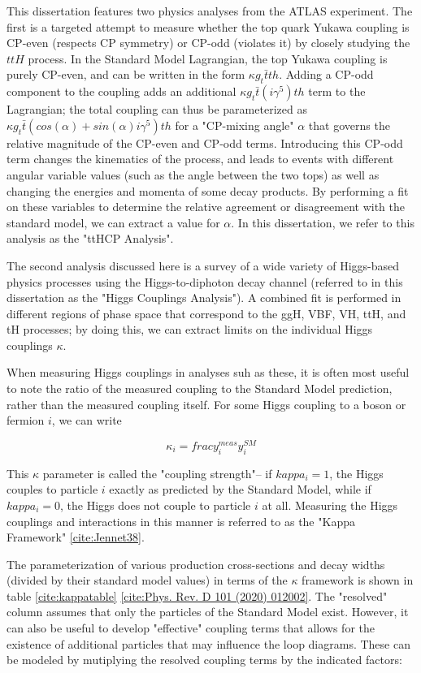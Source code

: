 This dissertation features two physics analyses from the ATLAS experiment. The first is a targeted attempt to measure whether the top quark Yukawa coupling is CP-even (respects CP symmetry) or CP-odd (violates it) by closely studying the $ttH$ process. In the Standard Model Lagrangian, the top Yukawa coupling is purely CP-even, and can be written in the form $\kappa g_{t} \bar{t}th$. Adding a CP-odd component to the coupling adds an additional $\kappa g_{t} \bar{t} (i \gamma^{5})th$ term to the Lagrangian; the total coupling can thus be parameterized as $\kappa g_{t} \bar{t} (cos(\alpha)+ sin(\alpha) i \gamma^{5} )th$ for a "CP-mixing angle" $\alpha$ that governs the relative magnitude of the CP-even and CP-odd terms. Introducing this CP-odd term changes the kinematics of the process, and leads to events with different angular variable values (such as the angle between the two tops) as well as changing the energies and momenta of some decay products. By performing a fit on these variables to determine the relative agreement or disagreement with the standard model, we can extract a value for $\alpha$. In this dissertation, we refer to this analysis as the "ttHCP Analysis".

The second analysis discussed here is a survey of a wide variety of Higgs-based physics processes using the Higgs-to-diphoton decay channel (referred to in this dissertation as the "Higgs Couplings Analysis"). A combined fit is performed in different regions of phase space that correspond to the ggH, VBF, VH, ttH, and tH processes; by doing this, we can extract limits on the individual Higgs couplings $\kappa$.

When measuring Higgs couplings in analyses suh as these, it is often most useful to note the ratio of the measured coupling to the Standard Model prediction, rather than the measured coupling itself. For some Higgs coupling to a boson or fermion $i$, we can write

\begin{equation}
\kappa_{i} = frac{y_{i}^{meas}}{y_{i}^{SM}}
\end{equation}

This $\kappa$ parameter is called the "coupling strength"-- if $kappa_{i} = 1$, the Higgs couples to particle $i$ exactly as predicted by the Standard Model, while if $kappa_{i} = 0$, the Higgs does not couple to particle $i$ at all. Measuring the Higgs couplings and interactions in this manner is referred to as the "Kappa Framework" \ref{cite:Jennet38}.

The parameterization of various production cross-sections and decay widths (divided by their standard model values) in terms of the $\kappa$ framework is shown in table \ref{cite:kappatable} \ref{cite:Phys. Rev. D 101 (2020) 012002}. The "resolved" column assumes that only the particles of the Standard Model exist. However, it can also be useful to develop "effective" coupling terms that allows for the existence of additional particles that may influence the loop diagrams. These can be modeled by mutiplying the resolved coupling terms by the indicated factors:

